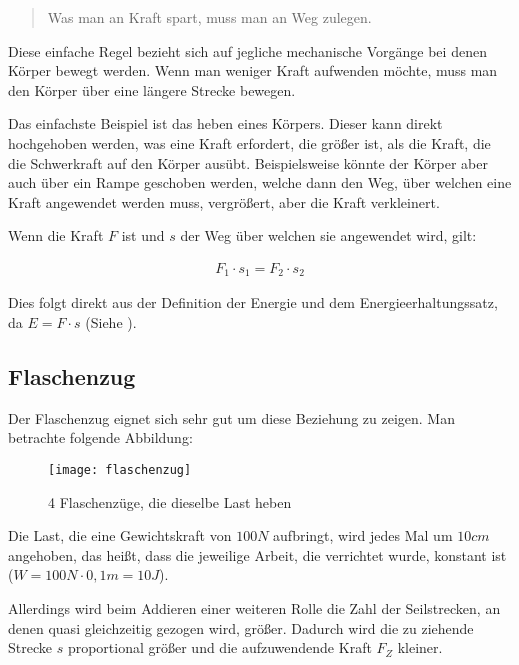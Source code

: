\begin{quote}
	\glqq Was man an Kraft spart, muss man an Weg zulegen.\grqq
\end{quote}

\noindent Diese einfache Regel bezieht sich auf jegliche mechanische Vorgänge bei denen Körper bewegt werden. Wenn man weniger Kraft aufwenden möchte, muss man den Körper über eine längere Strecke bewegen. 

Das einfachste Beispiel ist das heben eines Körpers. Dieser kann direkt hochgehoben werden, was eine Kraft erfordert, die größer ist, als die Kraft, die die Schwerkraft auf den Körper ausübt. Beispielsweise könnte der Körper aber auch über ein Rampe geschoben werden, welche dann den Weg, über welchen eine Kraft angewendet werden muss, vergrößert, aber die Kraft verkleinert. 

Wenn die Kraft $F$ ist und $s$ der Weg über welchen sie angewendet wird, gilt:

\begin{align}
	F_{1} \cdot s_1 = F_{2} \cdot s_2
\end{align}

\noindent Dies folgt direkt aus der Definition der Energie und dem Energieerhaltungssatz, da $E=F \cdot s$ (Siehe ).

\subsection{Flaschenzug}

Der Flaschenzug eignet sich sehr gut um diese Beziehung zu zeigen. Man betrachte folgende Abbildung:

\begin{figure}[h!]
	\texttt{[image: flaschenzug]}
	\caption{4 Flaschenzüge, die dieselbe Last heben}
	\label{fig:flaschenzug}
\end{figure}

Die Last, die eine Gewichtskraft von $100N$ aufbringt, wird jedes Mal um $10cm$ angehoben, das heißt, dass die jeweilige Arbeit, die verrichtet wurde, konstant ist ($W = 100N \cdot 0,1m = 10J$).

Allerdings wird beim Addieren einer weiteren Rolle die Zahl der Seilstrecken, an denen quasi gleichzeitig gezogen wird, größer. Dadurch wird die zu ziehende Strecke $s$ proportional größer und die aufzuwendende Kraft $F_Z$ kleiner.

